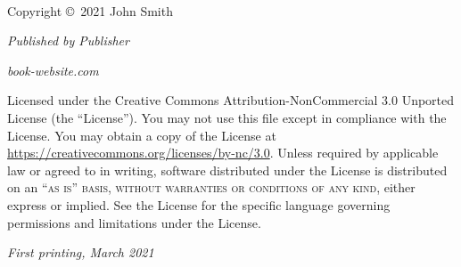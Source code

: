\documentclass[a4paper,12pt]{book}
\begin{document}
    \newpage
    \thispagestyle{empty}
    ~\vfill

    \noindent Copyright \copyright\ 2021 John Smith %

    \noindent \textsl{Published by Publisher} %

    \noindent \textit{book-website.com} %

    \noindent Licensed under the Creative Commons Attribution-NonCommercial 3.0 Unported License
    (the ``License'').
    You may not use this file except in compliance with the License.
    You may obtain a copy of the License at \url{https://creativecommons.org/licenses/by-nc/3.0}.
    Unless required by applicable law or agreed to in writing, software distributed under the
    License is distributed on an \textsc{``as is'' basis, without warranties or conditions of any
    kind}, either express or implied.
    See the License for the specific language governing permissions and limitations under the
    License. %

    \noindent \textit{First printing, March 2021} %

    \pagestyle{empty} %

    \tableofcontents %



    \pagestyle{fancy} %

    

    
\end{document}
